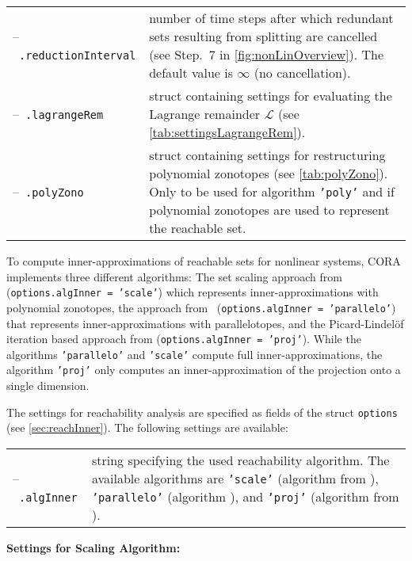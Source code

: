 \begin{center}
\begin{longtable}[t]{l p{10cm}}
	--~\texttt{.reductionInterval} & number of time steps after which redundant sets resulting from splitting are cancelled (see Step.~7 in \cref{fig:nonLinOverview}). The default value is $\infty$ (no cancellation). \\
	--~\texttt{.lagrangeRem} & struct containing settings for evaluating the Lagrange remainder $\mathcal{L}$ (see \cref{tab:settingsLagrangeRem}). \\
	--~\texttt{.polyZono} & struct containing settings for restructuring polynomial zonotopes (see \cref{tab:polyZono}). Only to be used for algorithm \texttt{'poly'} and if polynomial zonotopes are used to represent the reachable set.
\end{longtable}
\end{center}



To compute inner-approximations of reachable sets for nonlinear systems, CORA implements three different algorithms: The set scaling approach from~\cite{Kochdumper2020e} (\texttt{options.algInner = 'scale'}) which represents inner-approximations with polynomial zonotopes, the approach from~\cite{Goubault2020} \newline (\texttt{options.algInner = 'parallelo'}) that represents inner-approximations with parallelotopes, and the Picard-Lindel{\"o}f iteration based approach from \cite{Goubault2017} (\texttt{options.algInner = 'proj'}). While the algorithms \texttt{'parallelo'} and \texttt{'scale'} compute full inner-approximations, the algorithm \texttt{'proj'} only computes an inner-approximation of the projection onto a single dimension.

The settings for reachability analysis are specified as fields of the struct \texttt{options} (see \cref{sec:reachInner}). The following settings are available:

\begin{center}
\renewcommand{\arraystretch}{1.3}
\begin{longtable}[t]{l p{13cm}}	
	--~\texttt{.algInner} & string specifying the used reachability algorithm. The available algorithms are \texttt{'scale'} (algorithm from \cite{Kochdumper2020e}), \texttt{'parallelo'} (algorithm \cite{Goubault2020}), and \texttt{'proj'} (algorithm from \cite{Goubault2017}).
\end{longtable}
\end{center}

\textbf{Settings for Scaling Algorithm:}

